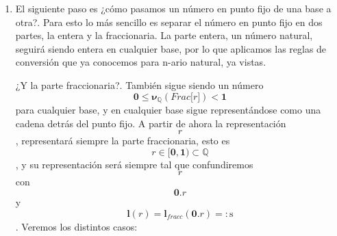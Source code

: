 \begin{enumerate}
\begin{enumerate}
    \[{\mathit{r} = {{\mathit{{Ent}{\lbrack r\rbrack}} \cdot \mathbf{\mathrm{.}}} \cdot \mathit{{Frac}{\lbrack r\rbrack}}}} \in {{{{\mathbf{d}_{\mathbf{\mathrm{\iota \neq 0}}} \cdot \left\lbrack \mathbf{D}_{\mathbf{\mathrm{n}}} \right\rbrack^{\mathbf{\mathrm{\ast}}}} \cdot \mathbf{\mathrm{.}}} \cdot \left\lbrack \mathbf{D}_{\mathbf{\mathrm{n}}} \right\rbrack^{\mathbf{\mathrm{\ast}}}} \cdot \mathbf{d}_{\mathbf{\mathrm{\iota \neq 0}}}}\]
    y
    \[\mathbf{l}{{(\mathit{r})} = \mathbf{l}_{\mathbf{\mathrm{\mathit{frac}}}}}{{(\mathit{r})} + \mathbf{l}_{\mathbf{\mathrm{\mathit{ent}}}}}{(\mathit{r})}\].
    Para evaluar el valor de la representación la fórmula es la clásica
    \[\mathbf{\nu}_{\mathbb{Q}}{{(\mathit{r})} = {\sum\limits_{\mathbf{\mathrm{\iota}} = \mathbf{\mathrm{\mathit{l}{(\mathit{{{Ent}{\lbrack r\rbrack}} - 1})}}}}^{\mathbf{\mathrm{{- \mathit{l}}{(\mathit{{Frac}{\lbrack r\rbrack}})}}}}\left( {{\mathbf{\nu}{(\mathit{r}_{\mathbf{\mathrm{\iota}}})}} \cdot \mathbf{n}^{\mathbf{\mathrm{\iota}}}} \right)}}\].
    En general aunque ponemos explícita\-mente el punto, no es necesario
    una vez se conocen la longitudes de las partes entera y
    fraccionaria.
  \item
    El siguiente paso es ¿cómo pasamos un número en punto fijo de una
    base a otra?. Para esto lo más sencillo es separar el número en
    punto fijo en dos partes, la entera y la fraccionaria. La parte
    entera, un número natural, seguirá siendo entera en cualquier base,
    por lo que aplicamos las reglas de conversión que ya conocemos para
    n-ario na\-tural, ya vistas.

    ¿Y la parte fraccionaria?. También sigue siendo un número
    \[{\mathbf{0} \leq \mathbf{\nu}_{\mathbb{Q}}}{{({\mathit{Frac}{\lbrack r\rbrack}})} < \mathbf{1}}\]para
    cualquier base, y en cualquier base sigue representándose como una
    cadena de\-trás del punto fijo. A partir de ahora la representación
    \[\mathit{r}\], representará siempre la parte fraccionaria, esto es
    \[{\mathit{r} \in \lbrack}\mathbf{0},\mathbf{1}{) \subset \mathbb{Q}}\]
    , y su representación será siempre tal que confundiremos
    \[\mathit{r}\]con \[\mathbf{0}.\mathit{r}\]y
    \[\mathbf{l}{{(\mathit{r})} = \mathbf{l}_{\mathbf{\mathrm{\mathit{fracc}}}}}{{({\mathbf{0}.\mathit{r}})} = :}\mathbf{\mathrm{s}}\].
    Veremos los distintos ca\-sos:


\end{enumerate}
\end{enumerate}
